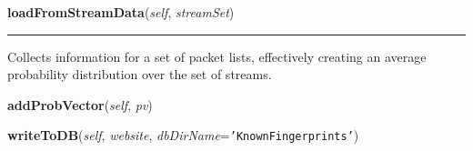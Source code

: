     \label{FingerprintAttackClasses:WebsiteFingerprint:loadFromStreamData}

    \vspace{0.5ex}

\hspace{.8\funcindent}\begin{boxedminipage}{\funcwidth}

    \raggedright \textbf{loadFromStreamData}(\textit{self}, \textit{streamSet})

    \vspace{-1.5ex}

    \rule{\textwidth}{0.5\fboxrule}
\setlength{\parskip}{2ex}
    Collects information for a set of packet lists, effectively creating an
    average probability distribution over the set of streams.

\setlength{\parskip}{1ex}
    \end{boxedminipage}

    \label{FingerprintAttackClasses:WebsiteFingerprint:addProbVector}

    \vspace{0.5ex}

\hspace{.8\funcindent}\begin{boxedminipage}{\funcwidth}

    \raggedright \textbf{addProbVector}(\textit{self}, \textit{pv})

\setlength{\parskip}{2ex}
\setlength{\parskip}{1ex}
    \end{boxedminipage}

    \label{FingerprintAttackClasses:WebsiteFingerprint:writeToDB}

    \vspace{0.5ex}

\hspace{.8\funcindent}\begin{boxedminipage}{\funcwidth}

    \raggedright \textbf{writeToDB}(\textit{self}, \textit{website}, \textit{dbDirName}={\tt \texttt{'}\texttt{KnownFingerprints}\texttt{'}})

\setlength{\parskip}{2ex}
\setlength{\parskip}{1ex}
    \end{boxedminipage}

